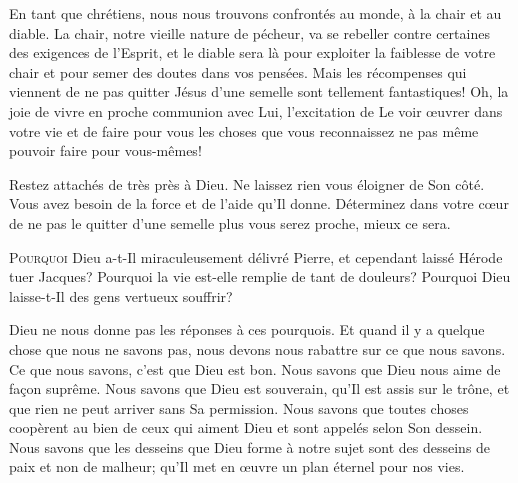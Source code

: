 En tant que chrétiens, nous nous trouvons confrontés au monde,
 à la chair et au diable. La chair, notre vieille nature de pécheur,
 va se rebeller contre certaines
 des exigences de l'Esprit, et le diable sera là pour exploiter
 la faiblesse de votre chair et pour semer des doutes dans vos pensées.
 Mais les récompenses qui viennent de ne pas quitter Jésus d'une semelle
 sont tellement fantastiques! Oh, la joie de vivre en proche communion avec Lui,
 l'excitation de Le voir \oe{}uvrer dans votre vie et de faire
 pour vous les choses que vous reconnaissez ne pas même pouvoir
 faire pour vous-mêmes!

Restez attachés de très près à Dieu. Ne laissez rien vous éloigner de Son côté.
 Vous avez besoin de la force et de l'aide qu'Il donne.
 Déterminez dans votre c\oe{}ur de ne pas le quitter d'une semelle
 \ocadr plus vous serez proche, mieux ce sera.

\dvrule






\lettrine{P}{ourquoi} Dieu a-t-Il miraculeusement délivré Pierre,
 et cependant laissé Hérode tuer Jacques?
 Pourquoi la vie est-elle remplie de tant de douleurs?
 Pourquoi Dieu laisse-t-Il des gens vertueux souffrir?

Dieu ne nous donne pas les réponses à ces pourquois.
 Et quand il y a quelque chose que nous ne savons pas,
 nous devons nous rabattre sur ce que nous savons.
 Ce que nous savons, c'est que Dieu est bon.
 Nous savons que Dieu nous aime de fa\c{c}on suprême.
 Nous savons que Dieu est souverain, qu'Il est assis sur le trône,
 et que rien ne peut arriver sans Sa permission.
 Nous savons que toutes choses coopèrent au bien de ceux
 qui aiment Dieu et sont appelés selon Son dessein.
 Nous savons que les desseins que Dieu forme à notre sujet
 sont des desseins de paix et non de malheur;
 qu'Il met en \oe{}uvre un plan éternel pour nos vies.


